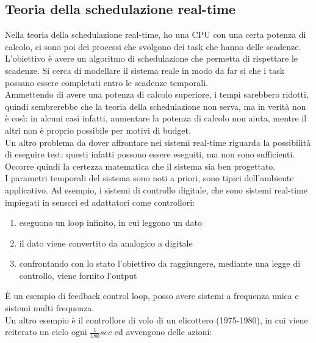 \documentclass[12pt, oneside]{extbook}
\begin{document}
\subsection{Teoria della schedulazione real-time}
Nella teoria della schedulazione real-time, ho una CPU con una certa potenza di calcolo, ci sono poi dei processi che svolgono dei task che hanno delle scadenze. L'obiettivo è avere un algoritmo di schedulazione che permetta di rispettare le scadenze. Si cerca di modellare il sistema reale in modo da far si che i task possano essere completati entro le scadenze temporali.\\ Ammettendo di avere una potenza di calcolo superiore, i tempi sarebbero ridotti, quindi sembrerebbe che la teoria della schedulazione non serva, ma in verità non è così: in alcuni casi infatti, aumentare la potenza di calcolo non aiuta, mentre il altri non è proprio possibile per motivi di budget.\\ Un altro problema da dover affrontare nei sistemi real-time riguarda la possibilità di eseguire test: questi infatti possono essere eseguiti, ma non sono sufficienti. Occorre quindi la certezza matematica che il sistema sia ben progettato.\\ I parametri temporali del sistema sono noti a priori, sono tipici dell'ambiente applicativo. Ad esempio, i sistemi di controllo digitale, che sono sistemi real-time impiegati in sensori ed adattatori come controllori: 
\begin{enumerate}
\item eseguono un loop infinito, in cui leggono un dato
\item il dato viene convertito da analogico a digitale
\item confrontando con lo stato l'obiettivo da raggiungere, mediante una legge di controllo, viene fornito l'output
\end{enumerate}
È un esempio di feedback control loop, posso avere sistemi a frequenza unica e sistemi multi frequenza.\\ Un altro esempio è il controllore di volo di un elicottero (1975-1980), in cui viene reiterato un ciclo ogni $\frac{1}{180}sec$ ed avvengono delle azioni: 
\end{document}
